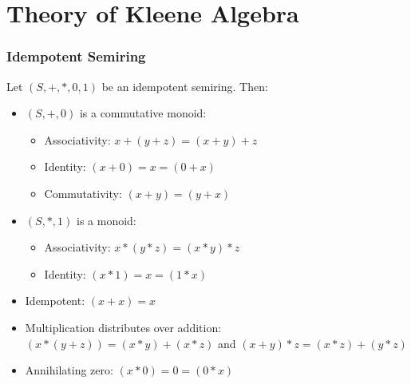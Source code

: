 \documentclass[xcolor={dvipsnames}]{beamer}
\begin{document}
\section{Theory of Kleene Algebra}

\begin{frame}
  \frametitle{Idempotent Semiring}
  Let $(S,+,*,0,1)$ be an idempotent semiring. Then:
  \begin{itemize}
    \item $(S,+,0)$ is a commutative monoid:
    \begin{itemize}
      \item Associativity: $ x + (y + z) = (x + y) + z$
      \item Identity: $ (x + 0) = x = (0 + x)$
      \item Commutativity: $ (x + y) = (y + x)$
    \end{itemize}
    \item $(S,*,1)$ is a monoid:
    \begin{itemize}
      \item Associativity: $ x * (y*z)  = (x*y)*z$
      \item Identity: $ (x * 1) = x = (1 * x)$
    \end{itemize}
    \item Idempotent: $ (x + x) = x$
    \item Multiplication distributes over addition: \( (x * (y + z)) = (x * y) + (x
    * z)\) and \( (x + y) * z = (x * z) + (y * z) \)
    \item Annihilating zero: \( (x * 0) = 0 = (0 * x)\)
    \end{itemize}

\end{frame}

\end{document}
